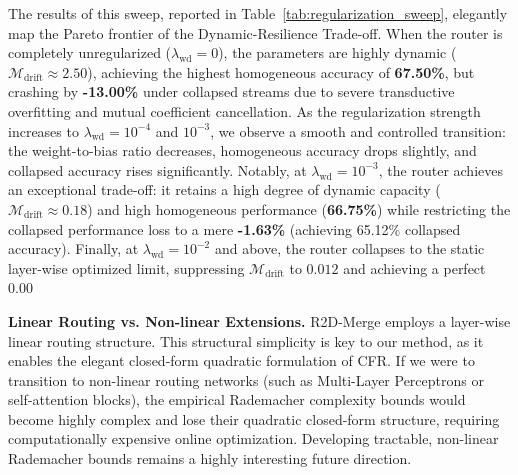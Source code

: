 The results of this sweep, reported in Table~\ref{tab:regularization_sweep}, elegantly map the Pareto frontier of the Dynamic-Resilience Trade-off.
When the router is completely unregularized ($\lambda_{\text{wd}} = 0$), the parameters are highly dynamic ($\mathcal{M}_{\text{drift}} \approx 2.50$), achieving the highest homogeneous accuracy of \textbf{67.50\%}, but crashing by \textbf{-13.00\%} under collapsed streams due to severe transductive overfitting and mutual coefficient cancellation.
As the regularization strength increases to $\lambda_{\text{wd}} = 10^{-4}$ and $10^{-3}$, we observe a smooth and controlled transition: the weight-to-bias ratio decreases, homogeneous accuracy drops slightly, and collapsed accuracy rises significantly.
Notably, at $\lambda_{\text{wd}} = 10^{-3}$, the router achieves an exceptional trade-off: it retains a high degree of dynamic capacity ($\mathcal{M}_{\text{drift}} \approx 0.18$) and high homogeneous performance (\textbf{66.75\%}) while restricting the collapsed performance loss to a mere \textbf{-1.63\%} (achieving 65.12\% collapsed accuracy).
Finally, at $\lambda_{\text{wd}} = 10^{-2}$ and above, the router collapses to the static layer-wise optimized limit, suppressing $\mathcal{M}_{\text{drift}}$ to $0.012$ and achieving a perfect 0.00%

\textbf{Linear Routing vs. Non-linear Extensions.} R2D-Merge employs a layer-wise linear routing structure. This structural simplicity is key to our method, as it enables the elegant closed-form quadratic formulation of CFR. If we were to transition to non-linear routing networks (such as Multi-Layer Perceptrons or self-attention blocks), the empirical Rademacher complexity bounds would become highly complex and lose their quadratic closed-form structure, requiring computationally expensive online optimization. Developing tractable, non-linear Rademacher bounds remains a highly interesting future direction.
